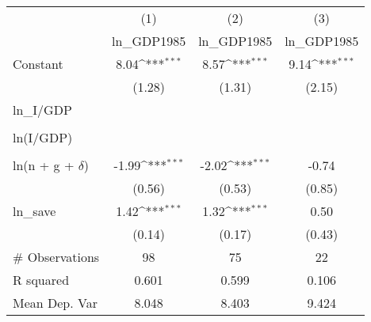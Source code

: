 {
\def\sym#1{\ifmmode^{#1}\else\(^{#1}\)\fi}
\begin{tabular}{l*{3}{c}}
\hline\hline
                    &\multicolumn{1}{c}{(1)}&\multicolumn{1}{c}{(2)}&\multicolumn{1}{c}{(3)}\\
                    &\multicolumn{1}{c}{ln\_GDP1985}&\multicolumn{1}{c}{ln\_GDP1985}&\multicolumn{1}{c}{ln\_GDP1985}\\
\hline
Constant            &        8.04\sym{***}&        8.57\sym{***}&        9.14\sym{***}\\
                    &      (1.28)         &      (1.31)         &      (2.15)         \\
[1em]
ln\_I/GDP            &                     &                     &                     \\
                    &                     &                     &                     \\
[1em]
ln(I/GDP)           &                     &                     &                     \\
                    &                     &                     &                     \\
[1em]
ln(n + g + $\delta$)&       -1.99\sym{***}&       -2.02\sym{***}&       -0.74         \\
                    &      (0.56)         &      (0.53)         &      (0.85)         \\
[1em]
ln\_save             &        1.42\sym{***}&        1.32\sym{***}&        0.50         \\
                    &      (0.14)         &      (0.17)         &      (0.43)         \\
\hline
\# Observations     &          98         &          75         &          22         \\
R squared           &       0.601         &       0.599         &       0.106         \\
Mean Dep. Var       &       8.048         &       8.403         &       9.424         \\
\hline\hline
\end{tabular}
}
